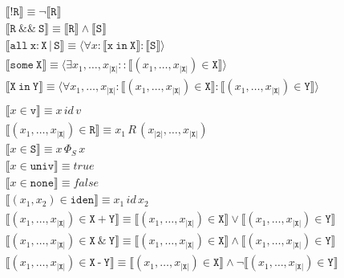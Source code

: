 \documentclass{llncs}
\begin{document}
\begin{figure}[t]
  \centering
\begin{align*}
&\llbracket \mathtt{! R} \rrbracket  \equiv \neg \llbracket \mathtt{R} \rrbracket  \\
&\llbracket \mathtt{R\ \&\&\ S} \rrbracket \equiv \llbracket \mathtt{R} \rrbracket \wedge \llbracket \mathtt{S} \rrbracket  \\
&\llbracket \mathtt{all\ x : X \, \texttt{|} \, S} \rrbracket \equiv \langle \forall x : \llbracket \mathtt{x\ \texttt{in}\ X} \rrbracket : \llbracket \mathtt{S} \rrbracket \rangle \\
&\llbracket \mathtt{some\ X} \rrbracket \equiv \langle \exists x_1,\dots,x_{|\mathtt{X}|} :: \llbracket (x_1,\dots,x_{|\mathtt{X}|}) \in \mathtt{X} \rrbracket \rangle   \\
&\llbracket \mathtt{X\ \texttt{in}\ Y} \rrbracket \equiv \langle \forall x_1,\dots,x_{|\mathtt{X}|} : \llbracket (x_1,\dots,x_{|\mathtt{X}|}) \in \mathtt{X} \rrbracket : \llbracket (x_1,\dots,x_{|\mathtt{X}|}) \in \mathtt{Y} \rrbracket \rangle  \\
&\\
&\llbracket x \in \mathtt{v} \rrbracket \equiv x\, id\, v  \\
&\llbracket (x_1,\dots,x_{|\mathtt{X}|}) \in \mathtt{R} \rrbracket \equiv x_1 \, R \, (x_{|\mathtt{2}|},\dots,x_{|\mathtt{X}|})  \\
&\llbracket x \in \mathtt{S} \rrbracket \equiv x \, \Phi_S \, x  \\
&\llbracket x \in \mathtt{univ} \rrbracket \equiv \mathit{true}   \\
&\llbracket x \in \mathtt{none} \rrbracket \equiv \mathit{false}   \\
&\llbracket (x_1,x_2) \in \mathtt{iden} \rrbracket \equiv x_1\, id\, x_2   \\
&\llbracket (x_1,\dots,x_{|\mathtt{X}|}) \in \mathtt{X\ \texttt{+}\ Y} \rrbracket \equiv \llbracket (x_1,\dots,x_{|\mathtt{X}|}) \in \mathtt{X} \rrbracket \vee \llbracket (x_1,\dots,x_{|\mathtt{X}|}) \in \mathtt{Y} \rrbracket \\
&\llbracket (x_1,\dots,x_{|\mathtt{X}|}) \in \mathtt{X\ \texttt{\&}\ Y} \rrbracket \equiv \llbracket (x_1,\dots,x_{|\mathtt{X}|}) \in \mathtt{X} \rrbracket \wedge \llbracket (x_1,\dots,x_{|\mathtt{X}|}) \in \mathtt{Y} \rrbracket  \\
&\llbracket (x_1,\dots,x_{|\mathtt{X}|}) \in \mathtt{X\ \texttt{-}\ Y} \rrbracket \equiv \llbracket (x_1,\dots,x_{|\mathtt{X}|}) \in \mathtt{X} \rrbracket \wedge \neg \llbracket (x_1,\dots,x_{|\mathtt{X}|}) \in \mathtt{Y} \rrbracket  \\

\end{align*}
\end{figure}
\end{document}
